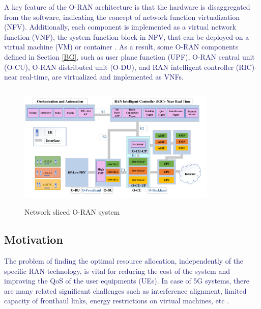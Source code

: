 \documentclass[lettersize,journal]{IEEEtran}
\begin{document}
\textcolor{MidnightBlue}{A key feature of the O-RAN architecture is that the hardware is disaggregated from the software, indicating the concept of network function virtualization (NFV). Additionally, each component is implemented as a virtual network function (VNF), the system function block in NFV, that can be deployed on a virtual machine (VM) or container \cite{mijumbi2015network, luo2020online}.}
\textcolor{MidnightBlue}{As a result, some O-RAN components defined in Section \ref{BG}, such as user plane function (UPF), O-RAN central unit (O-CU), O-RAN distributed unit (O-DU), and RAN intelligent controller (RIC)-near real-time, are virtualized and implemented as VNFs.}

\begin{figure}
  \centering
  \captionsetup{justification=centering}
    \includegraphics[width=9.5cm,height=6cm]{finalDraw1.pdf}
  \caption{Network sliced O-RAN system}
  \label{fig:c11}
\end{figure}
\subsection{Motivation}
\textcolor{MidnightBlue}{The problem of finding the optimal resource allocation, independently of the specific RAN technology, is vital for reducing the cost of the system and improving the QoS of the user equipments (UEs). In case of 5G systems, there are many related significant challenges such as interference alignment, limited capacity of fronthaul links, energy restrictions on virtual machines, etc \cite{lee2018dynamic,SystemCostMinimization, setayesh2020joint}.} 
\end{document}
